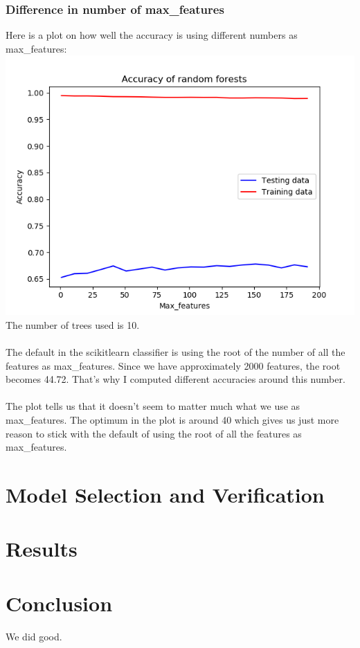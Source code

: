 \documentclass[parskip=half]{scrartcl}
\theoremstyle{definition}
\theoremstyle{remark}
\begin{document}
\subsubsection{Difference in number of max\_features}
Here is a plot on how well the accuracy is using different numbers as max\_features:\\
\includegraphics[scale=.7]{images/Max_featuresplot}\\
The number of trees used is 10.\\
\\
The default in the scikitlearn classifier is using the root of the number of all the features as max\_features. Since we have approximately 2000 features, the root becomes 44.72. That's why I computed different accuracies around this number.\\
\\
The plot tells us that it doesn't seem to matter much what we use as max\_features. The optimum in the plot is around 40 which gives us just more reason to stick with the default of using the root of all the features as max\_features.

\section{Model Selection and Verification}

\section{Results} \label{sec:results}

\section{Conclusion} \label{sec:conclusion}

We did good.


\end{document}
